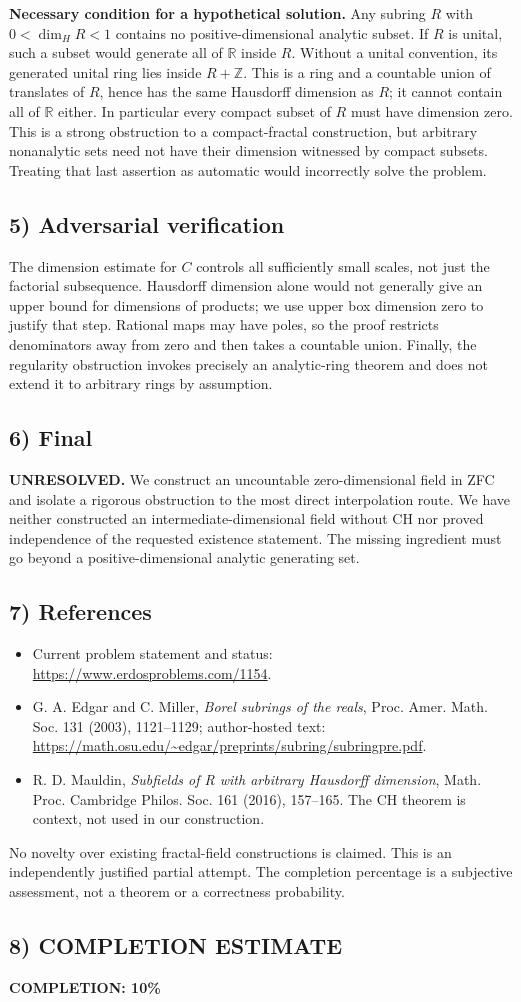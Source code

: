 \textbf{Necessary condition for a hypothetical solution.} Any subring $R$ with $0<\dim_H R<1$ contains no positive-dimensional analytic subset. If $R$ is unital, such a subset would generate all of $\mathbb R$ inside $R$. Without a unital convention, its generated unital ring lies inside $R+\mathbb Z$. This is a ring and a countable union of translates of $R$, hence has the same Hausdorff dimension as $R$; it cannot contain all of $\mathbb R$ either. In particular every compact subset of $R$ must have dimension zero. This is a strong obstruction to a compact-fractal construction, but arbitrary nonanalytic sets need not have their dimension witnessed by compact subsets. Treating that last assertion as automatic would incorrectly solve the problem.

\subsection*{5) Adversarial verification}
The dimension estimate for $C$ controls all sufficiently small scales, not just the factorial subsequence. Hausdorff dimension alone would not generally give an upper bound for dimensions of products; we use upper box dimension zero to justify that step. Rational maps may have poles, so the proof restricts denominators away from zero and then takes a countable union. Finally, the regularity obstruction invokes precisely an analytic-ring theorem and does not extend it to arbitrary rings by assumption.

\subsection*{6) Final}
\textbf{UNRESOLVED.} We construct an uncountable zero-dimensional field in ZFC and isolate a rigorous obstruction to the most direct interpolation route. We have neither constructed an intermediate-dimensional field without CH nor proved independence of the requested existence statement. The missing ingredient must go beyond a positive-dimensional analytic generating set.

\subsection*{7) References}
\begin{itemize}
\item Current problem statement and status: \url{https://www.erdosproblems.com/1154}.
\item G. A. Edgar and C. Miller, \emph{Borel subrings of the reals}, Proc. Amer. Math. Soc. 131 (2003), 1121--1129; author-hosted text: \url{https://math.osu.edu/~edgar/preprints/subring/subringpre.pdf}.
\item R. D. Mauldin, \emph{Subfields of R with arbitrary Hausdorff dimension}, Math. Proc. Cambridge Philos. Soc. 161 (2016), 157--165. The CH theorem is context, not used in our construction.
\end{itemize}
No novelty over existing fractal-field constructions is claimed. This is an independently justified partial attempt. The completion percentage is a subjective assessment, not a theorem or a correctness probability.
\subsection*{8) COMPLETION ESTIMATE}
\textbf{COMPLETION: 10\%}
